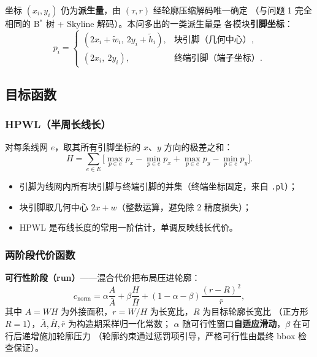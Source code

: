 \documentclass[12pt,a4paper]{article}
\begin{document}
坐标 $(x_i, y_i)$ 仍为\textbf{派生量}，由 $(\tau, r)$ 经轮廓压缩解码唯一确定
（与问题 1 完全相同的 B$^*$ 树 + Skyline 解码）。本问多出的一类派生量是
各模块\textbf{引脚坐标}：
\[
p_i = \begin{cases}
(2x_i + \tilde w_i,\ 2y_i + \tilde h_i), & \text{块引脚（几何中心）},\\
(2x_i,\ 2y_i), & \text{终端引脚（端子坐标）}.
\end{cases}
\]

\subsection{目标函数}

\subsubsection{HPWL（半周长线长）}

对每条线网 $e$，取其所有引脚坐标的 $x$、$y$ 方向的极差之和：
\begin{equation}
\label{eq:hpwl}
H = \sum_{e \in E} \Big[
\max_{p \in e} p_x - \min_{p \in e} p_x
+ \max_{p \in e} p_y - \min_{p \in e} p_y \Big].
\end{equation}

\begin{itemize}
    \item 引脚为线网内所有块引脚与终端引脚的并集（终端坐标固定，来自
    \texttt{.pl}）；
    \item 块引脚取几何中心 $2x + w$（整数运算，避免除 2 精度损失）；
    \item HPWL 是布线长度的常用一阶估计，单调反映线长代价。
\end{itemize}

\subsubsection{两阶段代价函数}

\textbf{可行性阶段（run）}——混合代价把布局压进轮廓：
\begin{equation}
c_{\text{norm}} = \alpha \frac{A}{\bar A}
+ \beta \frac{H}{\bar H}
+ (1 - \alpha - \beta) \frac{(r - R)^2}{\bar r},
\end{equation}
其中 $A = WH$ 为外接面积，$r = W/H$ 为长宽比，$R$ 为目标轮廓长宽比
（正方形 $R = 1$），$\bar A, \bar H, \bar r$ 为构造期采样归一化常数；
$\alpha$ 随可行性窗口\textbf{自适应滑动}，$\beta$ 在可行后递增施加轮廓压力
（轮廓约束通过惩罚项引导，严格可行性由最终 bbox 检查保证）。
\end{document}
